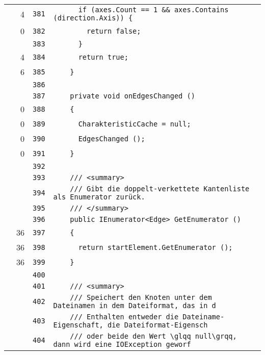 \documentclass[a4paper,10pt]{article}
\begin{document}
\begin{longtable}[l]{lrrl}
\cellcolor{green} & 4 & \verb~381~ & \verb~      if (axes.Count == 1 && axes.Contains (direction.Axis)) {~\\
\cellcolor{red} & 0 & \verb~382~ & \verb~        return false;~\\
\cellcolor{gray} &  & \verb~383~ & \verb~      }~\\
\cellcolor{green} & 4 & \verb~384~ & \verb~      return true;~\\
\cellcolor{green} & 6 & \verb~385~ & \verb~    }~\\
\cellcolor{gray} &  & \verb~386~ & \verb~~\\
\cellcolor{gray} &  & \verb~387~ & \verb~    private void onEdgesChanged ()~\\
\cellcolor{red} & 0 & \verb~388~ & \verb~    {~\\
\cellcolor{red} & 0 & \verb~389~ & \verb~      CharakteristicCache = null;~\\
\cellcolor{red} & 0 & \verb~390~ & \verb~      EdgesChanged ();~\\
\cellcolor{red} & 0 & \verb~391~ & \verb~    }~\\
\cellcolor{gray} &  & \verb~392~ & \verb~~\\
\cellcolor{gray} &  & \verb~393~ & \verb~    /// <summary>~\\
\cellcolor{gray} &  & \verb~394~ & \verb~    /// Gibt die doppelt-verkettete Kantenliste als Enumerator zurück.~\\
\cellcolor{gray} &  & \verb~395~ & \verb~    /// </summary>~\\
\cellcolor{gray} &  & \verb~396~ & \verb~    public IEnumerator<Edge> GetEnumerator ()~\\
\cellcolor{green} & 36 & \verb~397~ & \verb~    {~\\
\cellcolor{green} & 36 & \verb~398~ & \verb~      return startElement.GetEnumerator ();~\\
\cellcolor{green} & 36 & \verb~399~ & \verb~    }~\\
\cellcolor{gray} &  & \verb~400~ & \verb~~\\
\cellcolor{gray} &  & \verb~401~ & \verb~    /// <summary>~\\
\cellcolor{gray} &  & \verb~402~ & \verb~    /// Speichert den Knoten unter dem Dateinamen in dem Dateiformat, das in d~\\
\cellcolor{gray} &  & \verb~403~ & \verb~    /// Enthalten entweder die Dateiname-Eigenschaft, die Dateiformat-Eigensch~\\
\cellcolor{gray} &  & \verb~404~ & \verb~    /// oder beide den Wert \glqq null\grqq, dann wird eine IOException geworf~\\

\end{longtable}
\end{document}

